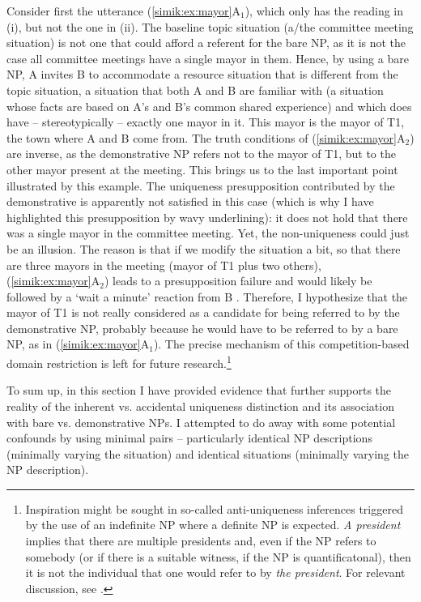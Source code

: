 \documentclass[output=paper,colorlinks,citecolor=brown,newtxmath]{langscibook}
\begin{document}
\noindent Consider first the utterance (\ref{simik:ex:mayor}A$_1$), which only has the reading in (i), but not the one in (ii). The baseline topic situation (a/the committee meeting situation) is not one that could afford a referent for the bare NP, as it is not the case all committee meetings have a single mayor in them. Hence, by using a bare NP, A invites B to accommodate a resource situation that is different from the topic situation, a situation that both A and B are familiar with (a situation whose facts are based on A's and B's common shared experience) and which does have -- stereotypically -- exactly one mayor in it. This mayor is the mayor of T1, the town where A and B come from. The truth conditions of (\ref{simik:ex:mayor}A$_2$) are inverse, as the demonstrative NP refers not to the mayor of T1, but to the other mayor present at the meeting. This brings us to the last important point illustrated by this example. The uniqueness presupposition contributed by the demonstrative is apparently not satisfied in this case (which is why I have highlighted this presupposition by wavy underlining): it does not hold that there was a single mayor in the committee meeting. Yet, the non-uniqueness could just be an illusion. The reason is that if we modify the situation a bit, so that there are three mayors in the meeting (mayor of T1 plus two others), (\ref{simik:ex:mayor}A$_2$) leads to a presupposition failure and would likely be followed by a `wait a minute' reaction from B \citep{vonFintel2008}. Therefore, I hypothesize that the mayor of T1 is not really considered as a candidate for being referred to by the demonstrative NP, probably because he would have to be referred to by a bare NP, as in (\ref{simik:ex:mayor}A$_1$). The precise mechanism of this competition-based domain restriction is left for future research.\footnote{Inspiration might be sought in so-called anti-uniqueness inferences triggered by the use of an indefinite NP where a definite NP is expected. \textit{A  president} implies that there are multiple  presidents and, even if the NP refers to somebody (or if there is a suitable witness, if the NP is quantificatonal), then it is not the individual that one would refer to by \textit{the  president}. For relevant discussion, see \citet{Hawkins1978,Heim1991,Sauerland2008}.}

To sum up, in this section I have provided evidence that further supports the reality of the inherent vs. accidental uniqueness distinction and its association with bare vs. demonstrative NPs. I attempted to do away with some potential confounds by using minimal pairs -- particularly identical NP descriptions (minimally varying the situation) and identical situations (minimally varying the NP description).
\end{document}
